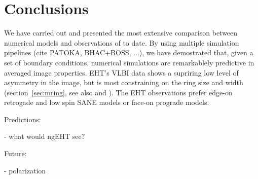 \section{Conclusions}\label{sec:conclusions}


We have carried out and presented the most extensive comparison
between numerical models and observations of \sgra to date.
By using multiple simulation pipelines (cite PATOKA, BHAC+BOSS, ...),
we have demostrated that, given a set of boundary conditions,
numerical simulations are remarkablely predictive in averaged image
properties.
EHT's VLBI data shows a supriring low level of asymmetry in the image,
but is most constraining on the ring size and width
(section~\ref{sec:mring}, see also \citealt{EHTpaperIII} and
\citealt{EHTpaperIV}).
The EHT observations prefer edge-on retrogade and low spin SANE models
or face-on prograde models.

Predictions:

- what would ngEHT see?

Future:

- polarization
